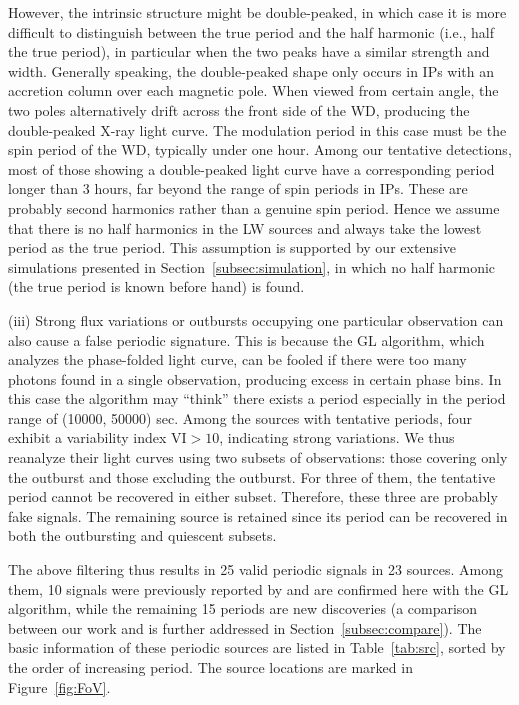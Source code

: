 \documentclass[fleqn,usenatbib]{mnras}
\begin{document}
However, the intrinsic structure might be double-peaked, in which case it is more difficult to distinguish between the true period and the half harmonic (i.e., half the true period), in particular when the two peaks have a similar strength and width.
Generally speaking, the double-peaked shape only occurs in IPs with an accretion column over each magnetic pole. When viewed from certain angle, the two poles alternatively drift across the front side of the WD, producing the double-peaked X-ray light curve. The modulation period in this case must be the spin period of the WD, typically under one hour. Among our tentative detections, most of those showing a double-peaked light curve have a corresponding period longer than 3 hours, far beyond the range of spin periods in IPs. 
These are probably second harmonics rather than a genuine spin period. 
Hence we assume that there is no half harmonics in the LW sources and always take the lowest period as the true period. This assumption is supported by our extensive simulations presented in Section~\ref{subsec:simulation}, in which no half harmonic (the true period is known before hand) is found.  

(iii) Strong flux variations or outbursts occupying one particular observation can also cause a false periodic signature. This is because the GL algorithm, which analyzes the phase-folded light curve, can be fooled if there were too many photons found in a single observation, producing excess in certain phase bins. In this case the algorithm may ``think'' there exists a period especially in the period range of (10000, 50000) sec. Among the sources with tentative periods, four exhibit a variability index VI$>10$, indicating strong variations. We thus reanalyze their light curves using two subsets of observations: those covering only the outburst and those excluding the outburst. For three of them, the tentative period cannot be recovered in either subset. Therefore, these three are probably fake signals. The remaining source is retained since its period can be recovered in both the outbursting and quiescent subsets.

The above filtering thus results in 25 valid periodic signals in 23 sources.
Among them, 10 signals were previously reported by \citet{2012ApJ...746..165H} and are confirmed here with the GL algorithm, while the remaining 15 periods are new discoveries (a comparison between our work and \citealp{2012ApJ...746..165H} is further addressed in Section~\ref{subsec:compare}). 
The basic information of these periodic sources are listed in Table~\ref{tab:src}, sorted by the order of increasing period. The source locations are marked in Figure~\ref{fig:FoV}.
\end{document}
